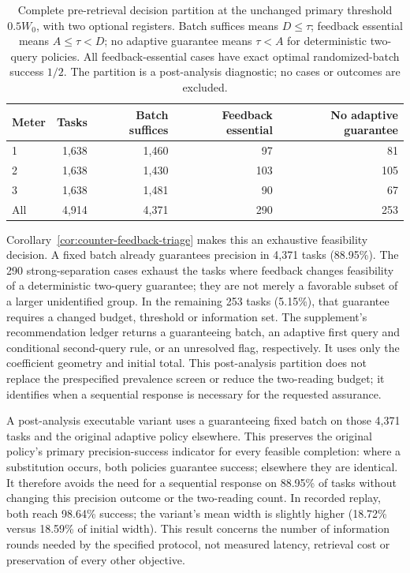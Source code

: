\begin{table}[htbp]\centering\small
\caption{Complete pre-retrieval decision partition at the unchanged primary
threshold $0.5W_0$, with two optional registers. Batch suffices means
$D\leq\tau$; feedback essential means $A\leq\tau<D$; no adaptive guarantee
means $\tau<A$ for deterministic two-query policies. All feedback-essential
cases have exact optimal randomized-batch success $1/2$. The partition is
a post-analysis diagnostic; no cases or outcomes are excluded.}
\label{tab:counter-guarantees}
\begin{tabular}{lrrrr}\toprule
Meter & Tasks & Batch suffices & Feedback essential & No adaptive guarantee\\\midrule
1 & 1,638 & 1,460 & 97 & 81\\
2 & 1,638 & 1,430 & 103 & 105\\
3 & 1,638 & 1,481 & 90 & 67\\
All & 4,914 & 4,371 & 290 & 253\\\bottomrule
\end{tabular}\end{table}

Corollary~\ref{cor:counter-feedback-triage} makes this an exhaustive
feasibility decision. A fixed batch already guarantees precision in
4,371 tasks (88.95\%). The 290 strong-separation cases exhaust the tasks
where feedback changes feasibility of a deterministic two-query guarantee;
they are not merely a favorable subset of a larger unidentified group.
In the remaining 253 tasks (5.15\%), that guarantee requires a changed
budget, threshold or information set. The supplement's recommendation
ledger returns a guaranteeing batch, an adaptive first query and conditional
second-query rule, or an unresolved flag, respectively. It uses only the
coefficient geometry and initial total. This post-analysis partition
does not replace the prespecified prevalence screen or reduce the
two-reading budget; it identifies when a sequential response is necessary
for the requested assurance.

A post-analysis executable variant uses a guaranteeing fixed batch on
those 4,371 tasks and the original adaptive policy elsewhere. This preserves
the original policy's primary precision-success indicator for every
feasible completion: where a substitution occurs, both policies guarantee
success; elsewhere they are identical. It therefore avoids the need for a
sequential response on 88.95\% of tasks without changing this precision
outcome or the two-reading count. In recorded replay, both reach 98.64\%
success; the variant's mean width is slightly higher (18.72\% versus
18.59\% of initial width). This result concerns the number of information
rounds needed by the specified protocol, not measured latency, retrieval
cost or preservation of every other objective.

